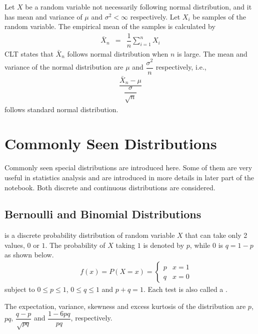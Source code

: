 Let $X$ be a random variable not necessarily following normal distribution, and it has mean and variance of $\mu$ and $\sigma^2<\infty$ respectively. Let $X_i$ be samples of the random variable. The empirical mean of the samples is calculated by
\begin{eqnarray}
	\bar{X}_n &=& \dfrac{1}{n}\sum_{i=1}^{n}X_i \nonumber
\end{eqnarray}
CLT states that $\bar{X}_n$ follows normal distribution when $n$ is large. The mean and variance of the normal distribution are $\mu$ and $\dfrac{\sigma^2}{n}$ respectively, i.e.,
\begin{eqnarray}
	\dfrac{\bar{X}_n-\mu}{\dfrac{\sigma}{\sqrt{n}}} \nonumber
\end{eqnarray}
follows standard normal distribution. 

\section{Commonly Seen Distributions}

Commonly seen special distributions are introduced here. Some of them are very useful in statistics analysis and are introduced in more details in later part of the notebook. Both discrete and continuous distributions are considered.

\subsection{Bernoulli and Binomial Distributions}

 is a discrete probability distribution of random variable $X$ that can take only 2 values, $0$ or $1$. The probability of $X$ taking $1$ is denoted by $p$, while $0$ is $q=1-p$ as shown below.
\begin{eqnarray}
  && f(x) = P(X=x) = \left\{\begin{array}{cc}
                           p & x=1 \\
                           q & x=0
                         \end{array}\right. \nonumber
\end{eqnarray}
subject to $0\leq p \leq 1$, $0\leq q \leq 1$ and $p+q=1$. Each test is also called a .

The expectation, variance, skewness and excess kurtosis of the distribution are $p$, $pq$, $\dfrac{q-p}{\sqrt{pq}}$ and $\dfrac{1-6pq}{pq}$, respectively.

